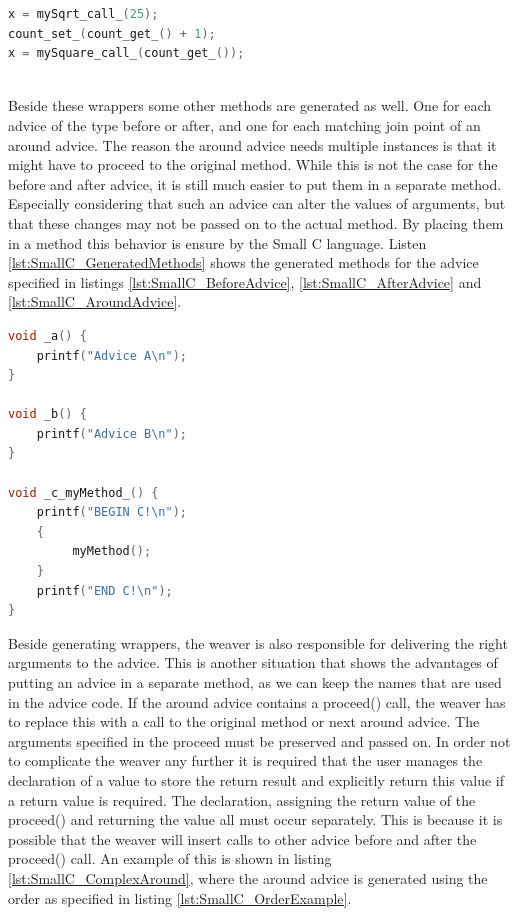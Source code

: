 \documentclass[a4paper]{report}
\begin{document}
\begin{minipage}{0.45\textwidth}
\begin{lstlisting}[language=C, caption=Example of code after weaving, label=lst:SmallC_WrapperUsageAfter]
x = mySqrt_call_(25);
count_set_(count_get_() + 1);
x = mySquare_call_(count_get_());
\end{lstlisting}
\end{minipage}\\
Beside these wrappers some other methods are generated as well. One for each advice of the type before or after, and one for each matching join point of an around advice. The reason the around advice needs multiple instances is that it might have to proceed to the original method. While this is not the case for the before and after advice, it is still much easier to put them in a separate method. Especially considering that such an advice can alter the values of arguments, but that these changes may not be passed on to the actual method. By placing them in a method this behavior is ensure by the Small C language. Listen \ref{lst:SmallC_GeneratedMethods} shows the generated methods for the advice specified in listings \ref{lst:SmallC_BeforeAdvice}, \ref{lst:SmallC_AfterAdvice} and \ref{lst:SmallC_AroundAdvice}.\\
\begin{lstlisting}[language=C, caption=Generated methods, label=lst:SmallC_GeneratedMethods]
void _a() {
	printf("Advice A\n");
}

void _b() {
	printf("Advice B\n");
}

void _c_myMethod_() {
	printf("BEGIN C!\n");
	{
		 myMethod();
	}
	printf("END C!\n");
}
\end{lstlisting}
Beside generating wrappers, the weaver is also responsible for delivering the right arguments to the advice. This is another situation that shows the advantages of putting an advice in a separate method, as we can keep the names that are used in the advice code. If the around advice contains a proceed() call, the weaver has to replace this with a call to the original method or next around advice. The arguments specified in the proceed must be preserved and passed on. In order not to complicate the weaver any further it is required that the user manages the declaration of a value to store the return result and explicitly return this value if a return value is required. The declaration, assigning the return value of the proceed() and returning the value all must occur separately. This is because it is possible that the weaver will insert calls to other advice before and after the proceed() call. An example of this is shown in listing \ref{lst:SmallC_ComplexAround}, where the around advice is generated using the order as specified in listing \ref{lst:SmallC_OrderExample}.\\
\end{document}
